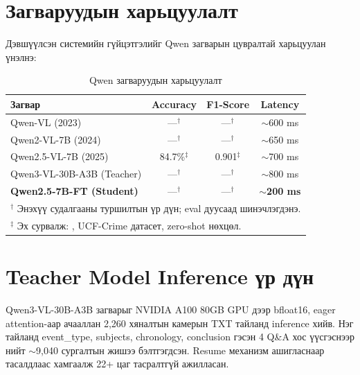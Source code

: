 \section{Загваруудын харьцуулалт}

Дэвшүүлсэн системийн гүйцэтгэлийг Qwen загварын цувралтай харьцуулан үнэлнэ:

\begin{table}[h]
\centering
\caption{Qwen загваруудын харьцуулалт}
\label{tab:model_comparison}
\begin{tabular}{lccc}
\hline
\textbf{Загвар} & \textbf{Accuracy} & \textbf{F1-Score} & \textbf{Latency} \\
\hline
Qwen-VL (2023)          & ---$^\dagger$     & ---$^\dagger$  & $\sim$600 ms \\
Qwen2-VL-7B (2024)      & ---$^\dagger$     & ---$^\dagger$  & $\sim$650 ms \\
Qwen2.5-VL-7B (2025)    & 84.7\%$^\ddagger$ & 0.901$^\ddagger$ & $\sim$700 ms \\
Qwen3-VL-30B-A3B (Teacher)  & ---$^\dagger$     & ---$^\dagger$  & $\sim$800 ms \\
\textbf{Qwen2.5-7B-FT (Student)} & ---$^\dagger$ & ---$^\dagger$ & \textbf{$\sim$200 ms} \\
\hline
\multicolumn{4}{l}{\footnotesize $^\dagger$ Энэхүү судалгааны туршилтын үр дүн; eval дуусаад шинэчлэгдэнэ.}\\
\multicolumn{4}{l}{\footnotesize $^\ddagger$ Эх сурвалж: \cite{Borodin2025}, UCF-Crime датасет, zero-shot нөхцөл.}\\
\end{tabular}
\end{table}

\section{Teacher Model Inference үр дүн}

Qwen3-VL-30B-A3B загварыг NVIDIA A100 80GB GPU дээр bfloat16, eager attention-аар ачааллан 2,260 хяналтын камерын TXT тайланд inference хийв. Нэг тайланд event\_type, subjects, chronology, conclusion гэсэн 4 Q\&A хос үүсгэснээр нийт $\sim$9,040 сургалтын жишээ бэлтгэгдсэн. Resume механизм ашигласнаар тасалдлаас хамгаалж 22+ цаг тасралтгүй ажилласан.

